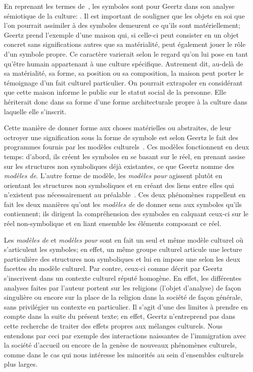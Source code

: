 En reprenant les termes de~\citet{Langer1962}, les symboles sont pour Geertz dans son analyse sémiotique de la culture: .
Il est important de souligner que les objets en soi que l'on pourrait assimiler à des symboles demeurent ce qu'ils sont matériellement; Geertz prend l'exemple d'une maison qui, si celle-ci peut consister en un objet concret sans significations autres que sa matérialité, peut également jouer le rôle d'un symbole propre.
Ce caractère varierait selon le regard qu'on lui pose en tant qu'être humain appartenant à une culture spécifique.
Autrement dit, au-delà de sa matérialité, sa forme, sa position ou sa composition, la maison peut porter le témoignage d'un fait culturel particulier.
On pourrait extrapoler en considérant que cette maison informe le public sur le statut social de la personne.
Elle hériterait donc dans sa forme d'une forme architecturale propre à la culture dans laquelle elle s'inscrit.

Cette manière de donner forme aux choses matérielles ou abstraites, de leur octroyer une signification sous la forme de symbole est selon Geertz le fait des programmes fournis par les modèles culturels~\citep[25]{Geertz1972}.
Ces modèles fonctionnent en deux temps: d'abord, ils créent les symboles en se basant sur le réel, en prenant assise sur les structures non symboliques déjà existantes, ce que Geertz nomme des \emph{modèles de}.
L'autre forme de modèle, les \emph{modèles pour} agissent plutôt en orientant les structures non symboliques et en créant des liens entre elles qui n'existent pas nécessairement au préalable~\citep[26--27]{Geertz1972}.
Ces deux phénomènes rappellent en fait les deux manières qu'ont les \emph{modèles de} de donner sens aux symboles qu'ils contiennent; ils dirigent la compréhension des symboles en calquant ceux-ci sur le réel non-symbolique et en liant ensemble les éléments composant ce réel.

Les \emph{modèles de} et \emph{modèles pour} sont en fait un seul et même modèle culturel où s'articulent les symboles; en effet, un même groupe culturel articule une lecture particulière des structures non symboliques et lui en impose une selon les deux facettes du modèle culturel.
Par contre, ceux-ci comme décrit par Geertz s'inscrivent dans un contexte culturel réputé homogène.
En effet, les différentes analyses faites par l'auteur portent sur les religions  (l'objet d'analyse) de façon singulière ou encore sur la place de la religion dans la société de façon générale, sans privilégier un contexte en particulier.
Il s'agit d'une des limites à prendre en compte dans la suite du présent texte; en effet, Geertz n'entreprend pas dans cette recherche de traiter des effets propres aux mélanges culturels.
Nous entendons par ceci par exemple des interactions naissantes de l'immigration avec la société d'accueil ou encore de la genèse de nouveaux phénomènes culturels, comme dans le cas qui nous intéresse les minorités \lgbt{} au sein d'ensembles culturels plus larges.

